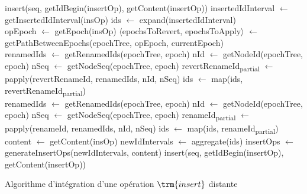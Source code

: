 \begin{algorithm}[!ht]
  \footnotesize
  \begin{algorithmic}[5]
            \State insert(seq, getIdBegin(insertOp), getContent(insertOp)) \label{alg:insertRemote-insert-1}
          \Else
            \State insertedIdInterval $\gets$ getInsertedIdInterval(insOp) \label{alg:insertRemote-get-ids}
            \State ids $\gets$ expand(insertedIdInterval)
            \\
            \State opEpoch $\gets$ getEpoch(insOp)
            \State $\langle$epochsToRevert, epochsToApply$\rangle$ $\gets$ getPathBetweenEpochs(epochTree, opEpoch, currentEpoch) \label{alg:insertRemote-get-path}
            \\
              \State renamedIds $\gets$ getRenamedIds(epochTree, epoch) \label{alg:insertRemote-retrieve-rename-data-1}
              \State nId $\gets$ getNodeId(epochTree, epoch)
              \State nSeq $\gets$ getNodeSeq(epochTree, epoch) \label{alg:insertRemote-retrieve-rename-data-2}
              \State revertRenameId\textsubscript{partial} $\gets$ papply(revertRenameId, renamedIds, nId, nSeq)
              \State ids $\gets$ map(ids, revertRenameId\textsubscript{partial}) \label{alg:insertRemote-revertRenameId}
            \EndFor
            \\
             \label{alg:insertRemote-renameId-1}
              \State renamedIds $\gets$ getRenamedIds(epochTree, epoch)
              \State nId $\gets$ getNodeId(epochTree, epoch)
              \State nSeq $\gets$ getNodeSeq(epochTree, epoch)
              \State renameId\textsubscript{partial} $\gets$ papply(renameId, renamedIds, nId, nSeq)
              \State ids $\gets$ map(ids, renameId\textsubscript{partial})
            \EndFor \label{alg:insertRemote-renameId-2}
            \\
            \State content $\gets$ getContent(insOp)
            \State newIdIntervals $\gets$ aggregate(ids) \label{alg:insertRemote-aggregate}
            \State insertOps $\gets$ generateInsertOps(newIdIntervals, content) \label{alg:insertRemote-generate}
              \State insert(seq, getIdBegin(insertOp), getContent(insertOp)) \label{alg:insertRemote-insert-2}
            \EndFor
        \EndIf
      \EndFunction
  \end{algorithmic}
  \caption{Algorithme d'intégration d'une opération $\trm{insert}$ distante}
  \label{alg:insertRemote}
\end{algorithm}

